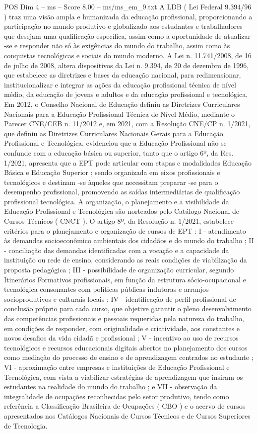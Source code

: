 \begin{textsample}{POS Dim 4 – ms – Score 8.00 – ms/ms\_em\_9.txt}
A LDB ( Lei Federal 9.394/96 ) traz uma visão ampla e humanizada da educação profissional, proporcionando a participação no mundo produtivo e globalizado aos estudantes e trabalhadores que desejam uma qualificação específica, assim como a oportunidade de atualizar -se e responder não só às exigências do mundo do trabalho, assim como às conquistas tecnológicas e sociais do mundo moderno.
A Lei n. 11.741/2008, de 16 de julho de 2008, altera dispositivos da Lei n. 9.394, de 20 de dezembro de 1996, que estabelece as diretrizes e bases da educação nacional, para redimensionar, institucionalizar e integrar as ações da educação profissional técnica de nível médio, da educação de jovens e adultos e da educação profissional e tecnológica.
Em 2012, o Conselho Nacional de Educação definiu as Diretrizes Curriculares Nacionais para a Educação Profissional Técnica de Nível Médio, mediante o Parecer CNE/CEB n. 11/2012 e, em 2021, com a Resolução CNE/CP n. 1/2021, que definiu as Diretrizes Curriculares Nacionais Gerais para a Educação Profissional e Tecnológica, evidenciou que a Educação Profissional não se confunde com a educação básica ou superior, tanto que o artigo 6º, da Res. 1/2021, apresenta que a EPT pode articular com etapas e modalidades Educação Básica e Educação Superior ; sendo organizada em eixos profissionais e tecnológicos e destinam -se àqueles que necessitam preparar -se para o desempenho profissional, promovendo as saídas intermediárias de qualificação profissional tecnológica.
A organização, o planejamento e a visibilidade da Educação Profissional e Tecnológica são norteados pelo Catálogo Nacional de Cursos Técnicos ( CNCT ).
O artigo 8º, da Resolução n. 1/2021, estabelece critérios para o planejamento e organização de cursos de EPT : I - atendimento às demandas socioeconômico ambientais dos cidadãos e do mundo do trabalho ; II - conciliação das demandas identificadas com a vocação e a capacidade da instituição ou rede de ensino, considerando as reais condições de viabilização da proposta pedagógica ; III - possibilidade de organização curricular, segundo Itinerários Formativos profissionais, em função da estrutura sócio-ocupacional e tecnológica consonantes com políticas públicas indutoras e arranjos socioprodutivos e culturais locais ; IV - identificação de perfil profissional de conclusão próprio para cada curso, que objetive garantir o pleno desenvolvimento das competências profissionais e pessoais requeridas pela natureza do trabalho, em condições de responder, com originalidade e criatividade, aos constantes e novos desafios da vida cidadã e profissional ; V - incentivo ao uso de recursos tecnológicos e recursos educacionais digitais abertos no planejamento dos cursos como mediação do processo de ensino e de aprendizagem centrados no estudante ; VI - aproximação entre empresas e instituições de Educação Profissional e Tecnológica, com vista a viabilizar estratégias de aprendizagem que insiram os estudantes na realidade do mundo do trabalho ; e VII - observação da integralidade de ocupações reconhecidas pelo setor produtivo, tendo como referência a Classificação Brasileira de Ocupações ( CBO ) e o acervo de cursos apresentados nos Catálogos Nacionais de Cursos Técnicos e de Cursos Superiores de Tecnologia.

\end{textsample}
